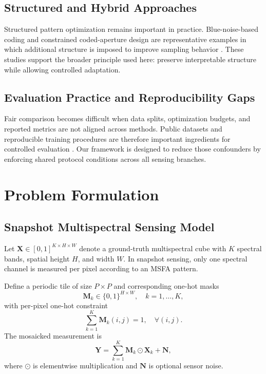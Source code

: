 \documentclass[journal]{IEEEtran}
\begin{document}
\subsection{Structured and Hybrid Approaches}
Structured pattern optimization remains important in practice. Blue-noise-based coding and constrained coded-aperture design are representative examples in which additional structure is imposed to improve sampling behavior \cite{correa2016,lau2000,rodriguez2008}. These studies support the broader principle used here: preserve interpretable structure while allowing controlled adaptation.

\subsection{Evaluation Practice and Reproducibility Gaps}
Fair comparison becomes difficult when data splits, optimization budgets, and reported metrics are not aligned across methods. Public datasets and reproducible training procedures are therefore important ingredients for controlled evaluation \cite{yasuma2010,kingma2014}. Our framework is designed to reduce those confounders by enforcing shared protocol conditions across all sensing branches.

\section{Problem Formulation}

\subsection{Snapshot Multispectral Sensing Model}
Let $\mathbf{X}\in[0,1]^{K\times H\times W}$ denote a ground-truth multispectral cube with $K$ spectral bands, spatial height $H$, and width $W$. In snapshot sensing, only one spectral channel is measured per pixel according to an MSFA pattern.

Define a periodic tile of size $P\times P$ and corresponding one-hot masks
\begin{equation}
\mathbf{M}_k \in \{0,1\}^{H\times W},\quad k=1,\dots,K,
\end{equation}
with per-pixel one-hot constraint
\begin{equation}
\sum_{k=1}^{K}\mathbf{M}_k(i,j)=1,\quad \forall(i,j).
\end{equation}
The mosaicked measurement is
\begin{equation}
\mathbf{Y}=\sum_{k=1}^{K}\mathbf{M}_k\odot \mathbf{X}_k + \mathbf{N},
\label{eq:forward}
\end{equation}
where $\odot$ is elementwise multiplication and $\mathbf{N}$ is optional sensor noise.
\end{document}
